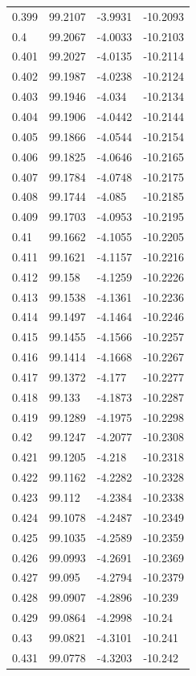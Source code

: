 \begin{tabular}{llll}
0.399 & 99.2107 & -3.9931 & -10.2093 \\
0.4 & 99.2067 & -4.0033 & -10.2103 \\
0.401 & 99.2027 & -4.0135 & -10.2114 \\
0.402 & 99.1987 & -4.0238 & -10.2124 \\
0.403 & 99.1946 & -4.034 & -10.2134 \\
0.404 & 99.1906 & -4.0442 & -10.2144 \\
0.405 & 99.1866 & -4.0544 & -10.2154 \\
0.406 & 99.1825 & -4.0646 & -10.2165 \\
0.407 & 99.1784 & -4.0748 & -10.2175 \\
0.408 & 99.1744 & -4.085 & -10.2185 \\
0.409 & 99.1703 & -4.0953 & -10.2195 \\
0.41 & 99.1662 & -4.1055 & -10.2205 \\
0.411 & 99.1621 & -4.1157 & -10.2216 \\
0.412 & 99.158 & -4.1259 & -10.2226 \\
0.413 & 99.1538 & -4.1361 & -10.2236 \\
0.414 & 99.1497 & -4.1464 & -10.2246 \\
0.415 & 99.1455 & -4.1566 & -10.2257 \\
0.416 & 99.1414 & -4.1668 & -10.2267 \\
0.417 & 99.1372 & -4.177 & -10.2277 \\
0.418 & 99.133 & -4.1873 & -10.2287 \\
0.419 & 99.1289 & -4.1975 & -10.2298 \\
0.42 & 99.1247 & -4.2077 & -10.2308 \\
0.421 & 99.1205 & -4.218 & -10.2318 \\
0.422 & 99.1162 & -4.2282 & -10.2328 \\
0.423 & 99.112 & -4.2384 & -10.2338 \\
0.424 & 99.1078 & -4.2487 & -10.2349 \\
0.425 & 99.1035 & -4.2589 & -10.2359 \\
0.426 & 99.0993 & -4.2691 & -10.2369 \\
0.427 & 99.095 & -4.2794 & -10.2379 \\
0.428 & 99.0907 & -4.2896 & -10.239 \\
0.429 & 99.0864 & -4.2998 & -10.24 \\
0.43 & 99.0821 & -4.3101 & -10.241 \\
0.431 & 99.0778 & -4.3203 & -10.242 \\

\end{tabular}
